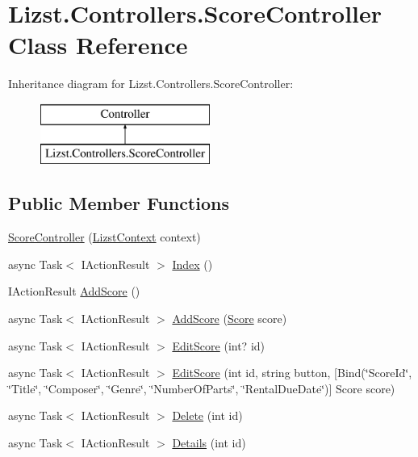 \hypertarget{class_lizst_1_1_controllers_1_1_score_controller}{}\section{Lizst.\+Controllers.\+Score\+Controller Class Reference}
\label{class_lizst_1_1_controllers_1_1_score_controller}
Inheritance diagram for Lizst.\+Controllers.\+Score\+Controller\+:\begin{figure}[H]
\begin{center}
\leavevmode
\includegraphics[height=2.000000cm]{class_lizst_1_1_controllers_1_1_score_controller}
\end{center}
\end{figure}
\subsection*{Public Member Functions}
\begin{DoxyCompactItemize}
\item 
\mbox{\hyperlink{class_lizst_1_1_controllers_1_1_score_controller_ad6cbc8ddb7679336c9e22ea0e4a8498d}{Score\+Controller}} (\mbox{\hyperlink{class_lizst_1_1_models_1_1_lizst_context}{Lizst\+Context}} context)
\item 
async Task$<$ I\+Action\+Result $>$ \mbox{\hyperlink{class_lizst_1_1_controllers_1_1_score_controller_ae54edce854673e9a7e4c9ad67e0d4f1e}{Index}} ()
\item 
I\+Action\+Result \mbox{\hyperlink{class_lizst_1_1_controllers_1_1_score_controller_a7f468b1cdcd6c24279cf0725f2e5fca4}{Add\+Score}} ()
\item 
async Task$<$ I\+Action\+Result $>$ \mbox{\hyperlink{class_lizst_1_1_controllers_1_1_score_controller_aeddde9c0dca6e9f378a73104158c6402}{Add\+Score}} (\mbox{\hyperlink{class_lizst_1_1_models_1_1_score}{Score}} score)
\item 
async Task$<$ I\+Action\+Result $>$ \mbox{\hyperlink{class_lizst_1_1_controllers_1_1_score_controller_a7111490634f5e49b4dd763f0783a97b7}{Edit\+Score}} (int? id)
\item 
async Task$<$ I\+Action\+Result $>$ \mbox{\hyperlink{class_lizst_1_1_controllers_1_1_score_controller_ad73bbf6fef35123251999432d02f6f06}{Edit\+Score}} (int id, string button, \mbox{[}Bind(\char`\"{}Score\+Id\char`\"{}, \char`\"{}Title\char`\"{}, \char`\"{}Composer\char`\"{}, \char`\"{}Genre\char`\"{}, \char`\"{}Number\+Of\+Parts\char`\"{}, \char`\"{}Rental\+Due\+Date\char`\"{})\mbox{]} Score score)
\item 
async Task$<$ I\+Action\+Result $>$ \mbox{\hyperlink{class_lizst_1_1_controllers_1_1_score_controller_ae7c2bd6abd03df821af650005148c1ae}{Delete}} (int id)
\item 
async Task$<$ I\+Action\+Result $>$ \mbox{\hyperlink{class_lizst_1_1_controllers_1_1_score_controller_ab146686f5233b4afbaadcb9bed2ae369}{Details}} (int id)
\end{DoxyCompactItemize}


